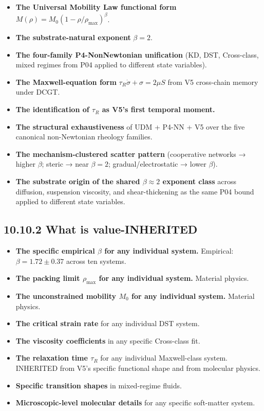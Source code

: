 \documentclass[11pt]{book}
\begin{document}
\begin{itemize}
\item \textbf{The Universal Mobility Law functional form} $M(\rho) = M_0(1-\rho/\rho_\mathrm{max})^\beta$.
\item \textbf{The substrate-natural exponent} $\beta = 2$.
\item \textbf{The four-family P4-NonNewtonian unification} (KD, DST, Cross-class, mixed regimes from P04 applied to different state variables).
\item \textbf{The Maxwell-equation form} $\tau_R\dot\sigma + \sigma = 2\mu S$ from V5 cross-chain memory under DCGT.
\item \textbf{The identification of $\tau_R$ as V5's first temporal moment.}
\item \textbf{The structural exhaustiveness} of UDM + P4-NN + V5 over the five canonical non-Newtonian rheology families.
\item \textbf{The mechanism-clustered scatter pattern} (cooperative networks → higher $\beta$; steric → near $\beta = 2$; gradual/electrostatic → lower $\beta$).
\item \textbf{The substrate origin of the shared $\beta \approx 2$ exponent class} across diffusion, suspension viscosity, and shear-thickening as the same P04 bound applied to different state variables.
\end{itemize}

\subsection{10.10.2 What is value-INHERITED}

\begin{itemize}
\item \textbf{The specific empirical $\beta$ for any individual system.} Empirical: $\beta = 1.72 \pm 0.37$ across ten systems.
\item \textbf{The packing limit $\rho_\mathrm{max}$ for any individual system.} Material physics.
\item \textbf{The unconstrained mobility $M_0$ for any individual system.} Material physics.
\item \textbf{The critical strain rate} for any individual DST system.
\item \textbf{The viscosity coefficients} in any specific Cross-class fit.
\item \textbf{The relaxation time $\tau_R$} for any individual Maxwell-class system. INHERITED from V5's specific functional shape and from molecular physics.
\item \textbf{Specific transition shapes} in mixed-regime fluids.
\item \textbf{Microscopic-level molecular details} for any specific soft-matter system.
\end{itemize}
\end{document}

